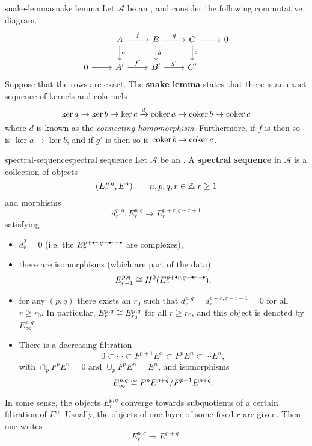 \begin{topic}{snake-lemma}{snake lemma}
    Let $\mathcal{A}$ be an , and consider the following commutative diagram.
    \[ \begin{tikzcd} & A \arrow{d}{a} \arrow{r}{f} & B \arrow{d}{b} \arrow{r}{g} & C \arrow{d}{c} \arrow{r} & 0 \\ 0 \arrow{r} & A' \arrow{r}{f'} & B' \arrow{r}{g'} & C' \end{tikzcd} \]
    Suppose that the rows are exact. The \textbf{snake lemma} states that there is an exact sequence of kernels and cokernels
    \[ \ker a \rightarrow \ker b \rightarrow \ker c \xrightarrow{d} \operatorname{coker} a \rightarrow \operatorname{coker} b \rightarrow \operatorname{coker} c \]
    where $d$ is known as the \textit{connecting homomorphism}. Furthermore, if $f$ is  then so is $\ker a \to \ker b$, and if $g'$ is  then so is $\operatorname{coker} b \to \operatorname{coker} c$.
\end{topic}

\begin{topic}{spectral-sequence}{spectral sequence}
    Let $\mathcal{A}$ be an . A \textbf{spectral sequence} in $\mathcal{A}$ is a collection of objects
    \[ (E_r^{p, q}, E^n) \qquad n, p, q, r \in \mathbb{Z}, r \ge 1 \]
    and morphisms
    \[ d_r^{p, q} : E_r^{p, q} \to E_r^{p + r, q - r + 1} \]
    satisfying
    \begin{itemize}
        \item $d_r^2 = 0$ (i.e. the $E_r^{p + \bdot r, q - \bdot r + \bdot}$ are complexes),
        \item there are isomorphisms (which are part of the data)
        \[ E_{r + 1}^{p, q} \isom H^0(E_r^{p + \bdot r, q - \bdot r + \bdot}), \]
        \item for any $(p, q)$ there exists an $r_0$ such that $d_r^{p, q} = d_r^{p - r, q + r - 1} = 0$ for all $r \ge r_0$. In particular, $E_r^{p, q} \cong E_{r_0}^{p, q}$ for all $r \ge r_0$, and this object is denoted by $E_\infty^{p, q}$.
        \item There is a decreasing filtration
        \[ 0 \subset \cdots \subset F^{p + 1} E^n \subset F^p E^n \subset \cdots E^n , \]
        with $\cap_p F^p E^n = 0$ and $\cup_p F^p E^n = E^n$, and isomorphisms
        \[ E_\infty^{p, q} \cong F^p E^{p + q} / F^{p + 1} E^{p + q} . \]
    \end{itemize}
    
    In some sense, the objects $E_r^{p, q}$ converge towards subquotients of a certain filtration of $E^n$. Usually, the objects of one layer of some fixed $r$ are given. Then one writes
    \[ E_r^{p, q} \Rightarrow E^{p + q} . \]
\end{topic}

